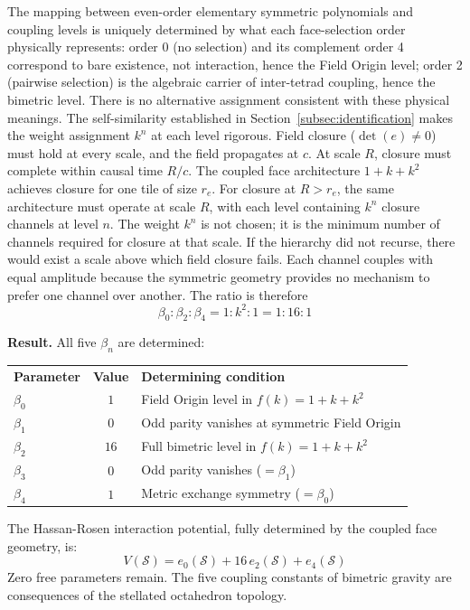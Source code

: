 \documentclass[aps,prd,preprint,superscriptaddress,showpacs,preprintnumbers,amsmath,amssymb,nofootinbib]{revtex4-2}
\begin{document}
The mapping between even-order elementary symmetric polynomials and coupling levels is uniquely determined by what each face-selection order physically represents: order 0 (no selection) and its complement order 4 correspond to bare existence, not interaction, hence the Field Origin level; order 2 (pairwise selection) is the algebraic carrier of inter-tetrad coupling, hence the bimetric level. There is no alternative assignment consistent with these physical meanings. The self-similarity established in Section~\ref{subsec:identification} makes the weight assignment $k^n$ at each level rigorous. Field closure ($\det(e) \neq 0$) must hold at every scale, and the field propagates at $c$. At scale $R$, closure must complete within causal time $R/c$. The coupled face architecture $1 + k + k^2$ achieves closure for one tile of size $r_e$. For closure at $R > r_e$, the same architecture must operate at scale $R$, with each level containing $k^n$ closure channels at level $n$. The weight $k^n$ is not chosen; it is the minimum number of channels required for closure at that scale. If the hierarchy did not recurse, there would exist a scale above which field closure fails. Each channel couples with equal amplitude because the symmetric geometry provides no mechanism to prefer one channel over another. The ratio is therefore
\begin{equation}
\beta_0 : \beta_2 : \beta_4 = 1 : k^2 : 1 = 1 : 16 : 1
\label{eq:beta-ratio}
\end{equation}

\textbf{Result.} All five $\beta_n$ are determined:
\begin{center}
\renewcommand{\arraystretch}{1.3}
\begin{tabular}{@{}lcl@{}}
\textbf{Parameter} & \textbf{Value} & \textbf{Determining condition} \\[2pt]
$\beta_0$ & $1$ & Field Origin level in $f(k) = 1 + k + k^2$ \\
$\beta_1$ & $0$ & Odd parity vanishes at symmetric Field Origin \\
$\beta_2$ & $16$ & Full bimetric level in $f(k) = 1 + k + k^2$ \\
$\beta_3$ & $0$ & Odd parity vanishes ($ = \beta_1$) \\
$\beta_4$ & $1$ & Metric exchange symmetry ($ = \beta_0$) \\
\end{tabular}
\end{center}
The Hassan-Rosen interaction potential, fully determined by the coupled face geometry, is:
\begin{equation}
V(\mathcal{S}) = e_0(\mathcal{S}) + 16\,e_2(\mathcal{S}) + e_4(\mathcal{S})
\label{eq:V-determined}
\end{equation}
Zero free parameters remain. The five coupling constants of bimetric gravity are consequences of the stellated octahedron topology.
\end{document}

